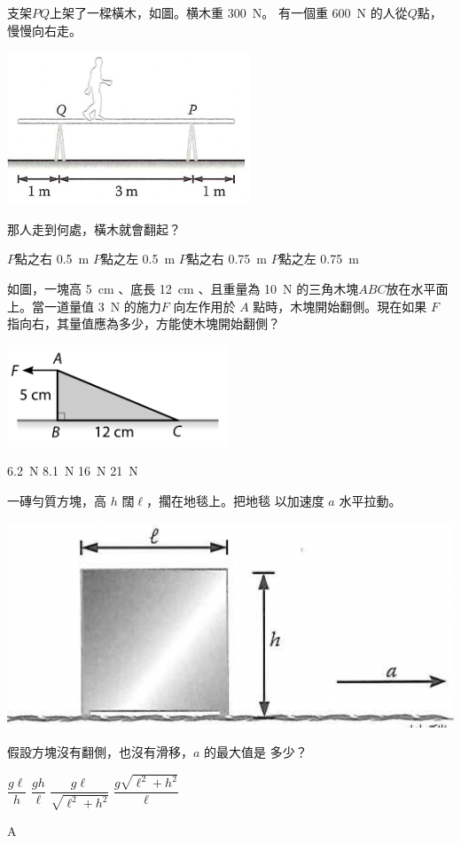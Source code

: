 
{
    支架$PQ$上架了一樑橫木，如圖。横木重 \qty{300}{N}。 有一個重 \qty{600}{N} 的人從$Q$點，慢慢向右走。\bigskip
    {\par\centering
        \includegraphics[width=.3\textwidth]{assets/efd30991.png}
        \par}\bigskip
    那人走到何處，橫木就會翻起？
    \begin{tasks}
        \task $P$點之右 \qty{0.5}{m}
        \task $P$點之左 \qty{0.5}{m}
        \task $P$點之右 \qty{0.75}{m}
        \task $P$點之左 \qty{0.75}{m}
    \end{tasks}
}{}

{
    如圖，一塊高 \qty{5}{cm} 、底長 \qty{12}{cm} 、且重量為 \qty{10}{N} 的三角木塊$ABC$放在水平面上。當一道量值 \qty{3}{N} 的施力$F$ 向左作用於 $A$ 點時，木塊開始翻側。現在如果 $F$ 指向右，其量值應為多少，方能使木塊開始翻側？\bigskip
    {\par\centering
        \includegraphics[width=.3\textwidth]{assets/ad661d08.png}
        \par}\bigskip
    \begin{tasks}
        \task \qty{6.2}{N}
        \task \qty{8.1}{N}
        \task \qty{16}{N}
        \task \qty{21}{N}

    \end{tasks}
}{}

{
    一磚勻質方塊，高 $h$ 闊$\ell$，擱在地毯上。把地毯 以加速度 $a$ 水平拉動。
    \bigskip
    {\par\centering
        \includegraphics[width=.3\textwidth]{assets/5b765e46.png}
        \par}\bigskip
    假設方塊沒有翻側，也沒有滑移，$a$ 的最大值是 多少？
    \begin{tasks}
        \task $\dfrac{g\ell}{h}$
        \task $\dfrac{gh}{\ell}$
        \task $\dfrac{g\ell}{\sqrt{\ell^2+h^2}}$
        \task $\dfrac{g\sqrt{\ell^2+h^2}}{\ell}$
    \end{tasks}
}{\mckey A}

